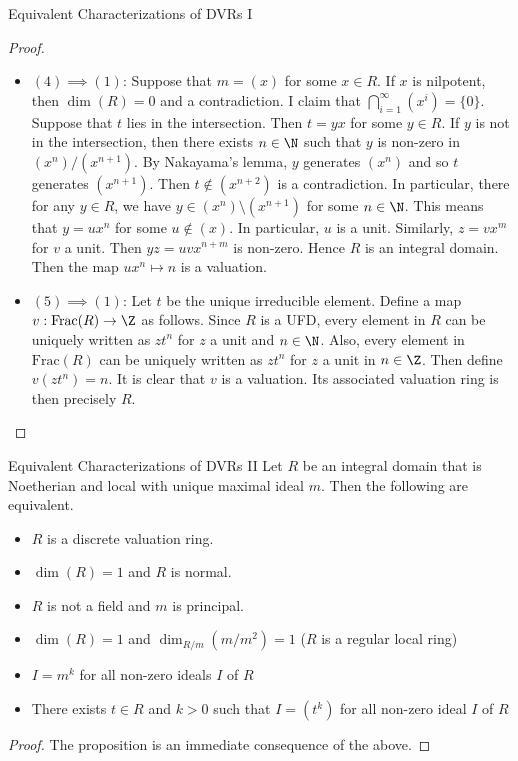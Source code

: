 \documentclass[a4paper]{article}
\begin{document}
\begin{prp}{Equivalent Characterizations of DVRs I}{}
\begin{proof}
\begin{itemize}
Thus $m$ is a PID. 
\item $(4)\implies(1)$: Suppose that $m=(x)$ for some $x\in R$. If $x$ is nilpotent, then $\dim(R)=0$ and a contradiction. I claim that $\bigcap_{i=1}^\infty(x^i)=\{0\}$. Suppose that $t$ lies in the intersection. Then $t=yx$ for some $y\in R$. If $y$ is not in the intersection, then there exists $n\in\N$ such that $y$ is non-zero in $(x^n)/(x^{n+1})$. By Nakayama's lemma, $y$ generates $(x^n)$ and so $t$ generates $(x^{n+1})$. Then $t\notin(x^{n+2})$ is a contradiction. In particular, there for any $y\in R$, we have $y\in(x^n)\setminus(x^{n+1})$ for some $n\in\N$. This means that $y=ux^n$ for some $u\notin(x)$. In particular, $u$ is a unit. Similarly, $z=vx^m$ for $v$ a unit. Then $yz=uvx^{n+m}$ is non-zero. Hence $R$ is an integral domain. Then the map $ux^n\mapsto n$ is a valuation. 
\item $(5)\implies(1)$: Let $t$ be the unique irreducible element. Define a map $v:\text{Frac}(R)\to\Z$ as follows. Since $R$ is a UFD, every element in $R$ can be uniquely written as $zt^n$ for $z$ a unit and $n\in\N$. Also, every element in $\text{Frac}(R)$ can be uniquely written as $zt^n$ for $z$ a unit in $n\in\Z$. Then define $v(zt^n)=n$. It is clear that $v$ is a valuation. Its associated valuation ring is then precisely $R$. 
\end{itemize}
\end{proof}
\end{prp}

\begin{prp}{Equivalent Characterizations of DVRs II}{} Let $R$ be an integral domain that is Noetherian and local with unique maximal ideal $m$. Then the following are equivalent. 
\begin{itemize}
\item $R$ is a discrete valuation ring. 
\item $\dim(R)=1$ and $R$ is normal. 
\item $R$ is not a field and $m$ is principal. 
\item $\dim(R)=1$ and $\dim_{R/m}(m/m^2)=1$ ($R$ is a regular local ring)
\item $I=m^k$ for all non-zero ideals $I$ of $R$
\item There exists $t\in R$ and $k>0$ such that $I=(t^k)$ for all non-zero ideal $I$ of $R$
\end{itemize} \tcbline
\begin{proof}
The proposition is an immediate consequence of the above. 
\end{proof}
\end{prp}
\end{document}
